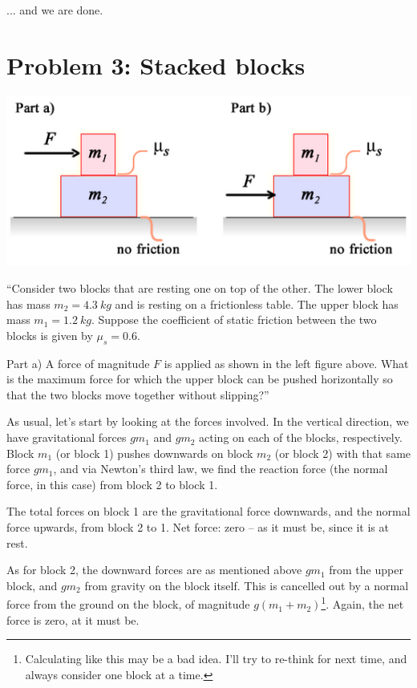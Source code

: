 \documentclass[12pt,a4paper]{report}
\begin{document}
... and we are done.

\section{Problem 3: Stacked blocks}

\begin{center}
\includegraphics[scale=0.65]{Graphics/h3p3}
\end{center}

``Consider two blocks that are resting one on top of the other. The lower block has mass $m_2 = \SI{4.3}{kg}$ and is resting on a frictionless table. The upper block has mass $m_1 = \SI{1.2}{kg}$. Suppose the coefficient of static friction between the two blocks is given by $\mu_s = 0.6$.

Part a) A force of magnitude $F$ is applied as shown in the left figure above. What is the maximum force for which the upper block can be pushed horizontally so that the two blocks move together without slipping?''

As usual, let's start by looking at the forces involved. In the vertical direction, we have gravitational forces $g m_1$ and $g m_2$ acting on each of the blocks, respectively.\\
Block $m_1$ (or block 1) pushes downwards on block $m_2$ (or block 2) with that same force $g m_1$, and via Newton's third law, we find the reaction force (the normal force, in this case) from block 2 to block 1.

The total forces on block 1 are the gravitational force downwards, and the normal force upwards, from block 2 to 1. Net force: zero -- as it must be, since it is at rest.

As for block 2, the downward forces are as mentioned above $g m_1$ from the upper block, and $g m_2$ from gravity on the block itself. This is cancelled out by a normal force from the ground on the block, of magnitude $g(m_1 + m_2)$\footnote{Calculating like this may be a bad idea. I'll try to re-think for next time, and always consider one block at a time.}. Again, the net force is zero, at it must be.
\end{document}
